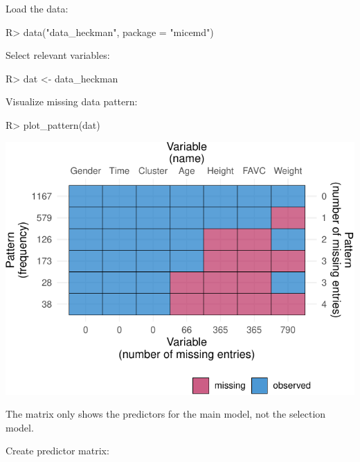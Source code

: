 \documentclass[
]{jss}
\begin{document}
Load the data:

\begin{CodeChunk}
\begin{CodeInput}
R> data("data_heckman", package = "micemd")
\end{CodeInput}
\end{CodeChunk}

Select relevant variables:

\begin{CodeChunk}
\begin{CodeInput}
R> dat <- data_heckman
\end{CodeInput}
\end{CodeChunk}

Visualize missing data pattern:

\begin{CodeChunk}
\begin{CodeInput}
R> plot_pattern(dat)
\end{CodeInput}


\begin{center}\includegraphics{Imputation_of_Incomplete_Multilevel_Data_files/figure-latex/obesity-md-1} \end{center}

\end{CodeChunk}

The matrix only shows the predictors for the main model, not the
selection model.

Create predictor matrix:
\end{document}
